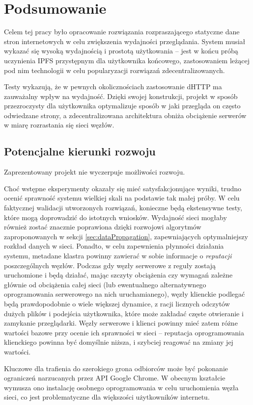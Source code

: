 \chapter{Podsumowanie}
\label{cha:summary}

Celem tej pracy było opracowanie rozwiązania rozpraszającego statyczne dane stron internetowych w celu zwiększenia wydajności przeglądania. System musiał wykazać się wysoką wydajnością i prostotą użytkowania -- jest w końcu próbą uczynienia IPFS przystępnym dla użytkownika końcowego, zastosowaniem leżącej pod nim technologii w celu popularyzacji rozwiązań zdecentralizowanych.

Testy wykazują, że w pewnych okolicznościach zastosowanie dHTTP ma zauważalny wpływ na wydajność. Dzięki swojej konstrukcji, projekt w sposób przezroczysty dla użytkownika optymalizuje sposób w jaki przegląda on często odwiedzane strony, a zdecentralizowana architektura obniża obciążenie serwerów w miarę rozrastania się sieci węzłów.

\section{Potencjalne kierunki rozwoju}
\label{sec:future}

Zaprezentowany projekt nie wyczerpuje możliwości rozwoju.

Choć wstępne eksperymenty okazały się mieć satysfakcjonujące wyniki, trudno ocenić  sprawność systemu wielkiej skali na podstawie tak małej próby. W celu faktycznej walidacji utworzonych rozwiązań, konieczne będą ekstensywne testy, które mogą doprowadzić do istotnych wniosków. Wydajność sieci mogłaby również zostać znacznie poprawiona dzięki rozwojowi algorytmów zaproponowanych w sekcji \ref{sec:dataPropagation}, zapewniających optymalniejszy rozkład danych w sieci. Ponadto, w celu zapewnienia płynności działania systemu, metadane klastra powinny zawierać w sobie informacje o {\em reputacji} poszczególnych węzłów. Podczas gdy węzły serwerowe z reguły zostają uruchomione i będą działać, mając szczyty obciążenia czy wymagań zależne głównie od obciążenia całej sieci (lub ewentualnego alternatywnego oprogramowania serwerowego na nich uruchamianego), węzły klienckie podlegać będą prawdopodobnie o wiele większej dynamice, z racji licznych odczytów dużych plików i podejścia użytkownika, które może zakładać częste otwieranie i zamykanie przeglądarki. Węzły serwerowe i klienci powinny mieć zatem różne wartości bazowe przy ocenie ich sprawności w sieci -- reputacja oprogramowania klienckiego powinna być domyślnie niższa, i szybciej reagować na zmiany jej wartości.

Kluczowe dla trafienia do szerokiego grona odbiorców może być pokonanie ograniczeń narzucanych przez API Google Chrome. W obecnym kształcie wymusza ono instalację osobnego oprogramowania w celu uruchomienia węzła sieci, co jest problematyczne dla większości użytkowników internetu.